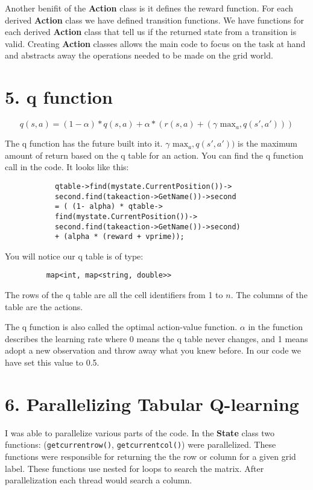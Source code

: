 \documentclass[12pt]{article}
\begin{document}
Another benifit of the \textbf{Action} class is it defines the 
reward function. For each derived \textbf{Action} class we have defined transition functions. We have functions for each derived \textbf{Action} class
that tell us if the returned state from a transition is
valid. Creating \textbf{Action} classes allows the main code 
to focus on the task at hand and abstracts away the operations
needed to be made on the grid world.

\section*{5. q function}

$$q(s,a) = (1-\alpha) * q(s,a) + \alpha * (r(s,a) + (\gamma \text{ max}_a,q(s',a')))$$

The q function has the future built into it. $\gamma \text{ max}_a,q(s',a'))$ is the
maximum amount of return based on the q table for an action.
You can find the q function call in the code. It looks like this:

\begin{figure}[h]
  \centering
    \begin{BVerbatim}
      qtable->find(mystate.CurrentPosition())->
      second.find(takeaction->GetName())->second 
      = ( (1- alpha) * qtable->
      find(mystate.CurrentPosition())->
      second.find(takeaction->GetName())->second) 
      + (alpha * (reward + vprime));
    \end{BVerbatim}
\end{figure}

You will notice our q table is of type:

\begin{figure}[h]
  \centering
  \begin{BVerbatim}
    map<int, map<string, double>>
  \end{BVerbatim}
\end{figure}

The rows of the q table are all the cell identifiers from 1 to $n$. 
The columns of the table are the actions. 

The q function is also called the optimal action-value function. $\alpha$ in the
function describes the learning rate where 0 means the q table never changes, and 1 means adopt a new observation 
and throw away what you knew before. In our code we have set this value to 0.5.

\section*{6. Parallelizing Tabular Q-learning}
I was able to parallelize various parts of the code. In the
\textbf{State} class two functions: (\verb|getcurrentrow()|, \verb|getcurrentcol()|) were parallelized. These functions 
were responsible for returning the 
the row or column for a given grid label. These functions use nested for loops to 
search the matrix. After parallelization each thread would search a column. 
\end{document}
